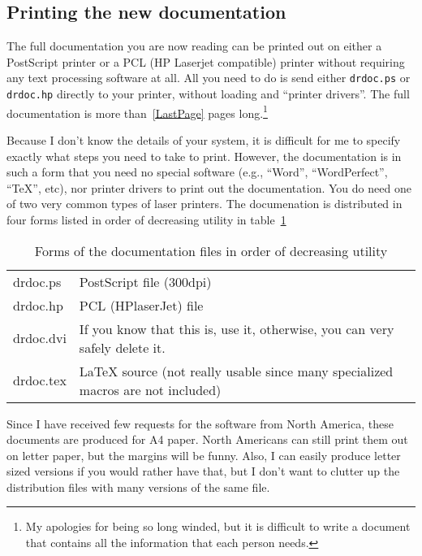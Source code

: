 \documentclass[%
	11pt,
        a4paper,
        twoside]{workrep}
\newcommand*{\file}[1]{\texttt{#1}}		%
\begin{document}
\subsection{Printing the new documentation}

The full documentation you are now reading can be printed out on
either a PostScript printer or a PCL (HP Laserjet compatible) printer
without requiring any text processing software at all.  All you need
to do is send either \file{drdoc.ps} or \file{drdoc.hp} directly
to your printer, without loading and ``printer drivers''.   The
full documentation is more than~\ref{LastPage} pages long.\footnote{%
  My apologies for being so long winded, but it is difficult
  to write a document that contains all the information that
  each person needs.}

Because I don't know the details of your system, it is difficult for
me to specify exactly what steps you need to take to print.  However,
the documentation is in such a form that you need no special software
(e.g., ``Word'', ``WordPerfect'', ``\TeX'', etc), nor printer
drivers to print out the documentation.  You do need one of
two very common types of laser printers.  The documenation is
distributed in four forms listed in order of decreasing utility in
table~\ref{tab:docfiles}

\begin{table}
\begin{center}
\begin{tabular}{>{\ttfamily}lp{7.5cm}}
     drdoc.ps	&	PostScript file (300dpi)\\
     drdoc.hp	&	PCL (HPlaserJet) file\\
     drdoc.dvi	&	If you know that this is, use it, otherwise,
			you can very safely delete it.\\
     drdoc.tex	&	 LaTeX source (not really usable since
			 many specialized macros are not included)
\end{tabular}
\end{center}
\caption[Forms of the documentation files]
  {Forms of the documentation files in order of decreasing utility}
  \label{tab:docfiles}
\end{table}

Since I have received few requests for the software from North America,
these documents are produced for A4 paper.  North Americans can
still print them out on letter paper, but the margins will be funny.
Also, I can easily produce letter sized versions if you would rather
have that, but I don't want to clutter up the distribution files
with many versions of the same file.
\end{document}
